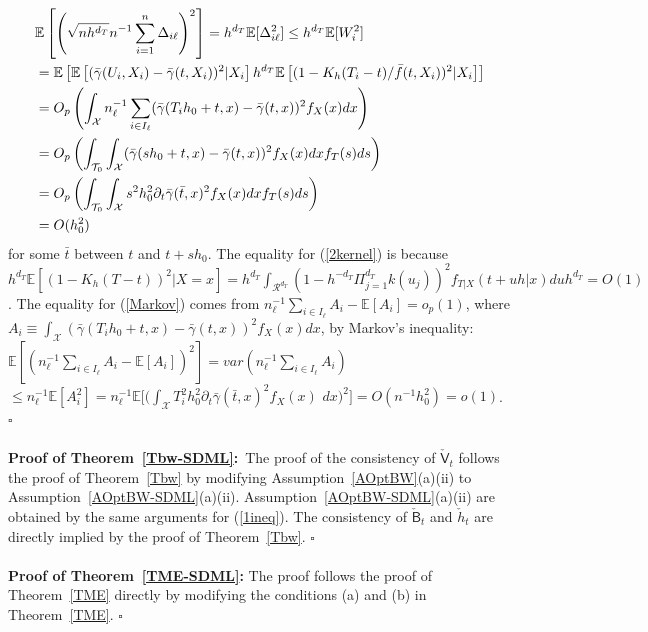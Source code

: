 \documentclass[lettersize, 12pt]{article}
\begin{document}
{\begin{align}
&\mathbb{E}\left[\left(
\sqrt{nh^{d_T}} n^{-1}\sum_{i=1}^n \Delta_{i\ell} 
\right)^2\right]
= h^{d_T}\mathbb{E}[\Delta_{i\ell}^2] 
\leq h^{d_T} \mathbb{E}[W_i^2 ]
\notag \\
&=
\mathbb{E}\left[
\mathbb{E}\left[
(\bar \gamma(U_i, X_i) - \bar \gamma(t, X_i))^2|X_i
\right]
h^{d_T}\mathbb{E}\left[
(1-K_h(T_i -t)/\bar f(t,X_i))^2
|X_i\right]
\right]
\notag\\
&=
O_p\left( \int_{\mathcal{X}}  n_\ell^{-1} \sum_{i\in I_\ell} 
(\bar \gamma(T_ih_0+t, x) - \bar \gamma(t, x))^2
f_X(x) dx\right) 
\label{2kernel}\\
&=
O_p\left( \int_{\mathcal{T}_0}\int_{\mathcal{X}}
(\bar \gamma(sh_0+t, x) - \bar \gamma(t, x))^2
f_X(x) dx f_T(s) ds\right) 
\label{Markov}\\
&=
O_p\left( \int_{\mathcal{T}_0}\int_{\mathcal{X}}
s^2 h_0^2 \partial_t \bar \gamma(\bar t, x)^2
f_X(x) dx f_T(s) ds\right) 
\notag\\
&= O(h_0^2)
\notag
\end{align}
for some $\bar t$ between $t$ and $t+sh_0$.
The equality for (\ref{2kernel}) is because 
$h^{d_T}\mathbb{E}[(1-K_h(T-t))^2|X=x]
= h^{d_T}\int_{\mathcal{R}^{d_T}} (1-h^{-d_T}\Pi_{j=1}^{d_T}k(u_j))^2 f_{T|X}(t+uh|x) du h^{d_T}
= O(1)$.
The equality for (\ref{Markov}) comes from $n_\ell^{-1} \sum_{i\in I_\ell} A_i - \mathbb{E}[A_i] = o_p(1)$, where $A_i \equiv  \int_{\mathcal{X}} (\bar \gamma(T_ih_0+t, x) - \bar \gamma(t, x))^2 f_X(x) dx$, 
by Markov's inequality:
$\mathbb{E}[(n_\ell^{-1} \sum_{i\in I_\ell} A_i - \mathbb{E}[A_i] )^2] 
= var(n_\ell^{-1} \sum_{i\in I_\ell}A_i)
$\\$\leq  n_\ell^{-1}\mathbb{E}[A_i^2] = n_\ell^{-1} \mathbb{E}\big[\big(
\int_{\mathcal{X}} T_i^2 h_0^2 \partial_t\bar \gamma(\bar t, x)^2 f_X(x)$ $dx
\big)^2\big] = O(n^{-1} h_0^2) = o(1)$.
\hfill$\square$
\\
\\
\textbf{Proof of Theorem~\ref{Tbw-SDML}:}\
The proof of the consistency of $\check{\mathsf{V}}_t$ follows the proof of Theorem~\ref{Tbw} by modifying Assumption~\ref{AOptBW}(a)(ii) to Assumption~\ref{AOptBW-SDML}(a)(ii).
Assumption~\ref{AOptBW-SDML}(a)(ii) are obtained by the same arguments for (\ref{1ineq}).
The consistency of $\check{\mathsf{B}}_t$ and $\check h_t$ are directly implied by the proof of Theorem~\ref{Tbw}. 
\hfill$\square$
\\
\\
\textbf{Proof of Theorem~\ref{TME-SDML}:}
The proof follows the proof of Theorem~\ref{TME} directly by modifying the conditions (a) and (b) in Theorem~\ref{TME}.
\hfill$\square$ 



}
\end{document}
